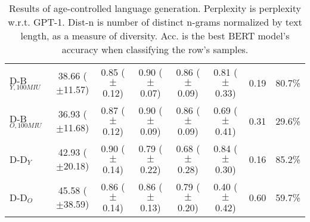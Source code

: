 \begin{table*}[h]
\begin{tabular}{l | c c c c | c c c}
    D-B$_{Y, 100MIU}$ & 38.66 ($\pm$11.57) & 0.85 ($\pm$0.12) & 0.90 ($\pm$0.07) & 0.86 ($\pm$0.09) & 0.81 ($\pm$0.33) & 0.19 & 80.7\%\\
    D-B$_{O, 100MIU}$ & 36.93 ($\pm$11.68) & 0.87 ($\pm$0.12) & 0.90 ($\pm$0.09) & 0.86 ($\pm$0.09) & 0.69 ($\pm$0.41) & 0.31 & 29.6\%\\
    \midrule
    D-D$_{Y}$ & 42.93 ($\pm$20.18) & 0.90 ($\pm$0.14) & 0.79 ($\pm$0.22) & 0.68 ($\pm$0.28) & 0.84 ($\pm$0.30) & 0.16 & 85.2\%\\
    D-D$_{O}$ & 45.58 ($\pm$38.59) & 0.86 ($\pm$0.14) & 0.86 ($\pm$0.13) & 0.79 ($\pm$0.20) & 0.40 ($\pm$0.42) & 0.60 & 59.7\%\\
    \bottomrule
    \end{tabular}
    \caption{ Results of age-controlled language generation. Perplexity is perplexity w.r.t. GPT-1. Dist-n is number of distinct n-grams normalized by text length, as a measure of diversity. Acc. is the best BERT model's accuracy when classifying the row's samples.}
    \label{tab:ctg_results_ws_old_prompt}
\end{table*}


